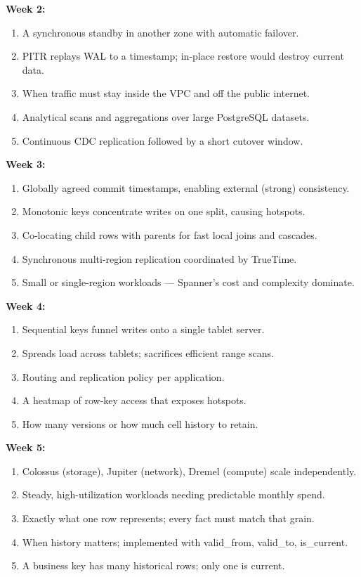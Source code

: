 \documentclass[11pt, a4paper]{article}
\begin{document}
\textbf{Week 2:}
\begin{enumerate}[nosep, leftmargin=1.5em]
    \item A synchronous standby in another zone with automatic failover.
    \item PITR replays WAL to a timestamp; in-place restore would destroy current data.
    \item When traffic must stay inside the VPC and off the public internet.
    \item Analytical scans and aggregations over large PostgreSQL datasets.
    \item Continuous CDC replication followed by a short cutover window.
\end{enumerate}

\textbf{Week 3:}
\begin{enumerate}[nosep, leftmargin=1.5em]
    \item Globally agreed commit timestamps, enabling external (strong) consistency.
    \item Monotonic keys concentrate writes on one split, causing hotspots.
    \item Co-locating child rows with parents for fast local joins and cascades.
    \item Synchronous multi-region replication coordinated by TrueTime.
    \item Small or single-region workloads --- Spanner's cost and complexity dominate.
\end{enumerate}

\textbf{Week 4:}
\begin{enumerate}[nosep, leftmargin=1.5em]
    \item Sequential keys funnel writes onto a single tablet server.
    \item Spreads load across tablets; sacrifices efficient range scans.
    \item Routing and replication policy per application.
    \item A heatmap of row-key access that exposes hotspots.
    \item How many versions or how much cell history to retain.
\end{enumerate}

\textbf{Week 5:}
\begin{enumerate}[nosep, leftmargin=1.5em]
    \item Colossus (storage), Jupiter (network), Dremel (compute) scale independently.
    \item Steady, high-utilization workloads needing predictable monthly spend.
    \item Exactly what one row represents; every fact must match that grain.
    \item When history matters; implemented with valid\_from, valid\_to, is\_current.
    \item A business key has many historical rows; only one is current.
\end{enumerate}
\end{document}
